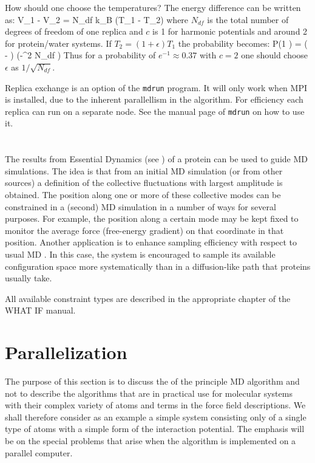 How should one choose the temperatures?
The energy difference can be written as:
\beq
V_1 - V_2 =  N_{df}  k_B (T_1 - T_2)
\eeq
where $N_{df}$ is the total number of degrees of freedom of one replica
and $c$ is 1 for harmonic potentials and around 2 for protein/water systems.
If $T_2 = (1+\epsilon) T_1$ the probability becomes:
\beq
P(1 )
  = \exp\left( - \right)
\approx \exp\left(-\epsilon^2  N_{df} \right)
\eeq
Thus for a probability of $e^{-1}\approx 0.37$ with $c=2$
one should choose $\epsilon$ as $1/\sqrt{N_{df}}$.

Replica exchange is an option of the {\tt mdrun} program. It will only
work when MPI is installed, due to the inherent parallellism in the
algorithm. For efficiency each replica can run on a separate node.
See the manual page of {\tt mdrun} on how to use it.


\section{}
The results from Essential Dynamics (see )
of a protein can be used to guide MD simulations. The idea is that
from an initial MD simulation (or from other sources) a definition of
the collective fluctuations with largest amplitude is obtained. The
position along one or more of these collective modes can be
constrained in a (second) MD simulation in a number of ways for
several purposes. For example, the position along a certain mode may
be kept fixed to monitor the average force (free-energy gradient) on
that coordinate in that position. Another application is to enhance
sampling efficiency with respect to usual MD
\cite{Degroot96a,Degroot96b}. In this case, the system is encouraged
to sample its available configuration space more systematically than
in a diffusion-like path that proteins usually take.

All available constraint types are described in the appropriate chapter
of the WHAT IF \cite{Whatif} manual.


\section{Parallelization}
\label{sec:par}

\newcommand{\abs}[1]{\mid \! {#1} \! \mid}

The purpose of this section is to discuss the 
 of the 
principle MD algorithm and not to describe the algorithms that are in 
practical use for molecular systems with their complex variety of atoms 
and terms in the force field descriptions. We shall therefore consider 
as an example a simple system consisting only of a single type of atoms 
with a simple form of the interaction potential. The emphasis will be 
on the special problems that arise when the algorithm is implemented on 
a parallel computer. 

